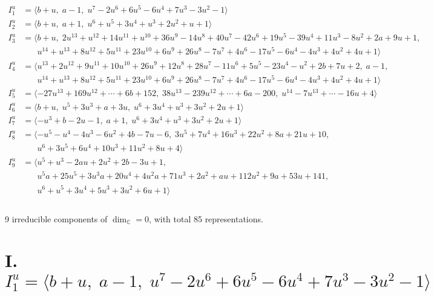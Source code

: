 \documentclass[1p]{elsarticle_modified}
\theoremstyle{definition}
\begin{document}
\begin{align*}
I^u_{1}&=\langle 
b+u,\;a-1,\;u^7-2 u^6+6 u^5-6 u^4+7 u^3-3 u^2-1\rangle \\
I^u_{2}&=\langle 
b+u,\;a+1,\;u^6+u^5+3 u^4+u^3+2 u^2+u+1\rangle \\
I^u_{3}&=\langle 
b+u,\;2 u^{13}+u^{12}+14 u^{11}+u^{10}+36 u^9-14 u^8+40 u^7-42 u^6+19 u^5-39 u^4+11 u^3-8 u^2+2 a+9 u+1,\\
\phantom{I^u_{3}}&\phantom{= \langle  }u^{14}+u^{13}+8 u^{12}+5 u^{11}+23 u^{10}+6 u^9+26 u^8-7 u^7+4 u^6-17 u^5-6 u^4-4 u^3+4 u^2+4 u+1\rangle \\
I^u_{4}&=\langle 
u^{13}+2 u^{12}+9 u^{11}+10 u^{10}+26 u^9+12 u^8+28 u^7-11 u^6+5 u^5-23 u^4- u^2+2 b+7 u+2,\;a-1,\\
\phantom{I^u_{4}}&\phantom{= \langle  }u^{14}+u^{13}+8 u^{12}+5 u^{11}+23 u^{10}+6 u^9+26 u^8-7 u^7+4 u^6-17 u^5-6 u^4-4 u^3+4 u^2+4 u+1\rangle \\
I^u_{5}&=\langle 
-27 u^{13}+169 u^{12}+\cdots+6 b+152,\;38 u^{13}-239 u^{12}+\cdots+6 a-200,\;u^{14}-7 u^{13}+\cdots-16 u+4\rangle \\
I^u_{6}&=\langle 
b+u,\;u^5+3 u^3+a+3 u,\;u^6+3 u^4+u^3+3 u^2+2 u+1\rangle \\
I^u_{7}&=\langle 
- u^3+b-2 u-1,\;a+1,\;u^6+3 u^4+u^3+3 u^2+2 u+1\rangle \\
I^u_{8}&=\langle 
- u^5- u^4-4 u^3-6 u^2+4 b-7 u-6,\;3 u^5+7 u^4+16 u^3+22 u^2+8 a+21 u+10,\\
\phantom{I^u_{8}}&\phantom{= \langle  }u^6+3 u^5+6 u^4+10 u^3+11 u^2+8 u+4\rangle \\
I^u_{9}&=\langle 
u^5+u^3-2 a u+2 u^2+2 b-3 u+1,\\
\phantom{I^u_{9}}&\phantom{= \langle  }u^5 a+25 u^5+3 u^3 a+20 u^4+4 u^2 a+71 u^3+2 a^2+a u+112 u^2+9 a+53 u+141,\\
\phantom{I^u_{9}}&\phantom{= \langle  }u^6+u^5+3 u^4+5 u^3+3 u^2+6 u+1\rangle \\
\\
\end{align*}
\raggedright * 9 irreducible components of $\dim_{\mathbb{C}}=0$, with total 85 representations.\\
\newpage
\renewcommand{\arraystretch}{1}
\centering \section*{I. $I^u_{1}= \langle b+u,\;a-1,\;u^7-2 u^6+6 u^5-6 u^4+7 u^3-3 u^2-1 \rangle$}
\end{document}

